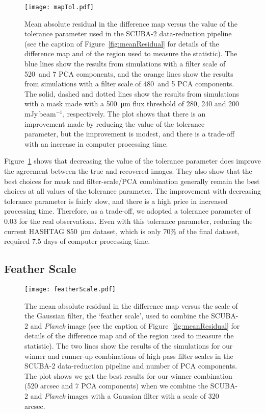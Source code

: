 \documentclass[a4paper,fleqn,usenatbib, twocolumn]{aastex63}
\begin{document}
\begin{figure}
  \centering
  \texttt{[image: mapTol.pdf]}
  \caption{Mean absolute residual in the difference map versus
  the value of the tolerance parameter used in the
  SCUBA-2 data-reduction pipeline (see the caption of Figure~\ref{fig:meanResidual}
  for details of the difference map and of the region used to measure
  the statistic).
  The blue lines 
           show the results from simulations with a filter scale of 520\arcsec\ and 7 PCA components, and the orange lines show the results from simulations with a 
           filter scale of 480\arcsec\ and 5 PCA components. The solid, dashed and dotted lines show the results from simulations with a mask
           made with a \SI{500}{\micro\meter} flux threshold of 280, 240 and 200\,mJy\,beam$^{-1}$, respectively. The plot shows that there is an
           improvement made by reducing the value of the tolerance parameter, but the
           improvement is modest, and there is a trade-off with an increase
           in computer processing time.}
  \label{fig:mapTol}
\end{figure}

Figure~\ref{fig:mapTol} shows that decreasing the value of the tolerance parameter does
improve the agreement between the true and recovered images. They also
show that the best choices for mask and filter-scale/PCA combination
generally remain the best choices at all values of the tolerance
parameter. The improvement with decreasing tolerance parameter is fairly
slow, and there is a high price in increased processing time.
Therefore, as a trade-off, we adopted a tolerance parameter
of 0.03 for the real observations. Even with this tolerance parameter,
reducing the current HASHTAG  \SI{850}{\micro\meter} dataset, which is only 70\% of
the final dataset, required 7.5 days of computer processing time.


\subsection{Feather Scale}

\begin{figure}
  \centering
  \texttt{[image: featherScale.pdf]}
  \caption{The mean absolute residual in the difference map versus
  the scale of the Gaussian filter, the `feather scale', used
  to combine the SCUBA-2 and {\it Planck} image
  (see the caption of Figure~\ref{fig:meanResidual}
  for details of the difference map and of the region used to measure
  the statistic). The two lines show the results of the simulations
  for our winner and runner-up combinations of high-pass filter scales in the
  SCUBA-2 data-reduction pipeline and number of PCA components.
  The plot shows we get the best results for our winner combination
  (520 arcsec and 7 PCA components) when we combine
  the SCUBA-2 and {\it Planck} images with a Gaussian filter
  with a scale of 320 arcsec.
  }
  \label{fig:featherScalePlot}
\end{figure}
\end{document}

